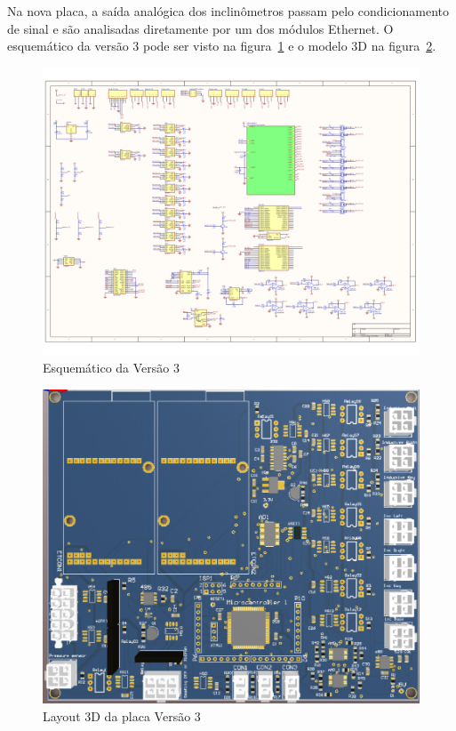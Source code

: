 Na nova placa, a saída analógica dos inclinômetros passam pelo condicionamento
de sinal e são analisadas diretamente por um dos módulos Ethernet. O esquemático
da versão 3 pode ser visto na figura~\ref{esquematicov3} e o modelo 3D na
figura~\ref{placav3}.

\begin{figure}[H]
\centering
\includegraphics[width=1\columnwidth]{figs/eletronica/esquematicov3.pdf}
\caption{Esquemático da Versão 3}
\label{esquematicov3}
\end{figure}

\begin{figure}[H]
\centering
\includegraphics[width=1\columnwidth]{figs/eletronica/placav3}
\caption{Layout 3D da placa Versão 3}
\label{placav3}
\end{figure}

